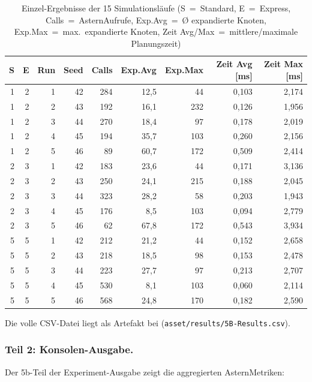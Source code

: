 \begin{table}[H]
    \centering
    \small
    \begin{tabular}{r r r r r r r r r}
        \toprule
        \textbf{S} & \textbf{E} & \textbf{Run} & \textbf{Seed} & \textbf{Calls} & \textbf{Exp.Avg} & \textbf{Exp.Max} & \textbf{Zeit Avg [ms]} & \textbf{Zeit Max [ms]} \\
        \midrule
        1 & 2 & 1 & 42 & 284 & 12{,}5 & 44  & 0{,}103 & 2{,}174 \\
        1 & 2 & 2 & 43 & 192 & 16{,}1 & 232 & 0{,}126 & 1{,}956 \\
        1 & 2 & 3 & 44 & 270 & 18{,}4 & 97  & 0{,}178 & 2{,}019 \\
        1 & 2 & 4 & 45 & 194 & 35{,}7 & 103 & 0{,}260 & 2{,}156 \\
        1 & 2 & 5 & 46 & 89  & 60{,}7 & 172 & 0{,}509 & 2{,}414 \\
        \midrule
        2 & 3 & 1 & 42 & 183 & 23{,}6 & 44  & 0{,}171 & 3{,}136 \\
        2 & 3 & 2 & 43 & 250 & 24{,}1 & 215 & 0{,}188 & 2{,}045 \\
        2 & 3 & 3 & 44 & 323 & 28{,}2 & 58  & 0{,}203 & 1{,}943 \\
        2 & 3 & 4 & 45 & 176 & 8{,}5  & 103 & 0{,}094 & 2{,}779 \\
        2 & 3 & 5 & 46 & 62  & 67{,}8 & 172 & 0{,}543 & 3{,}934 \\
        \midrule
        5 & 5 & 1 & 42 & 212 & 21{,}2 & 44  & 0{,}152 & 2{,}658 \\
        5 & 5 & 2 & 43 & 218 & 18{,}5 & 98  & 0{,}153 & 2{,}478 \\
        5 & 5 & 3 & 44 & 223 & 27{,}7 & 97  & 0{,}213 & 2{,}707 \\
        5 & 5 & 4 & 45 & 530 & 8{,}1  & 103 & 0{,}060 & 2{,}114 \\
        5 & 5 & 5 & 46 & 568 & 24{,}8 & 170 & 0{,}182 & 2{,}590 \\
        \bottomrule
    \end{tabular}
    \caption{Einzel-Ergebnisse der 15 Simulationsläufe (S~=~Standard, E~=~Express, Calls~=~\acs{Astern}Aufrufe, Exp.Avg~=~Ø expandierte Knoten, Exp.Max~=~max.\ expandierte Knoten, Zeit Avg/Max~=~mittlere/maximale Planungszeit)}
    \label{tab:raw_5b}
\end{table}

Die volle CSV-Datei liegt als Artefakt bei (\texttt{asset/results/5B-Results.csv}).

\subsubsection{Teil 2: Konsolen-Ausgabe.}
Der 5b-Teil der Experiment-Ausgabe zeigt die aggregierten \acs{Astern}Metriken:

